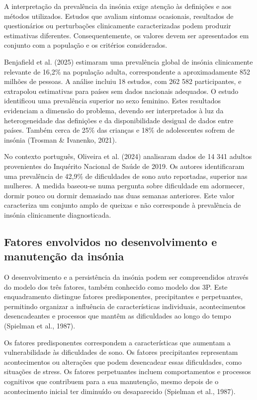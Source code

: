 A interpretação da prevalência da insónia exige atenção às definições e aos métodos utilizados. Estudos que avaliam sintomas ocasionais, resultados de questionários ou perturbações clinicamente caracterizadas podem produzir estimativas diferentes. Consequentemente, os valores devem ser apresentados em conjunto com a população e os critérios considerados.

Benjafield et al. (2025) estimaram uma prevalência global de insónia clinicamente relevante de 16,2\% na população adulta, correspondente a aproximadamente 852 milhões de pessoas. A análise incluiu 18 estudos, com 262 582 participantes, e extrapolou estimativas para países sem dados nacionais adequados. O estudo identificou uma prevalência superior no sexo feminino. Estes resultados evidenciam a dimensão do problema, devendo ser interpretados à luz da heterogeneidade das definições e da disponibilidade desigual de dados entre países. Também cerca de 25\% das crianças e 18\% de adolescentes sofrem de insónia (Trosman \& Ivanenko, 2021).

No contexto português, Oliveira et al. (2024) analisaram dados de 14 341 adultos provenientes do Inquérito Nacional de Saúde de 2019. Os autores identificaram uma prevalência de 42,9\% de dificuldades de sono auto reportadas, superior nas mulheres. A medida baseou-se numa pergunta sobre dificuldade em adormecer, dormir pouco ou dormir demasiado nas duas semanas anteriores. Este valor caracteriza um conjunto amplo de queixas e não corresponde à prevalência de insónia clinicamente diagnosticada.

\subsection{Fatores envolvidos no desenvolvimento e manutenção da insónia}
\label{sec:chap2_fatoresInsonia}

O desenvolvimento e a persistência da insónia podem ser compreendidos através do modelo dos três fatores, também conhecido como modelo dos 3P. Este enquadramento distingue fatores predisponentes, precipitantes e perpetuantes, permitindo organizar a influência de características individuais, acontecimentos desencadeantes e processos que mantêm as dificuldades ao longo do tempo (Spielman et al., 1987).

Os fatores predisponentes correspondem a características que aumentam a vulnerabilidade às dificuldades de sono. Os fatores precipitantes representam acontecimentos ou alterações que podem desencadear essas dificuldades, como situações de stress. Os fatores perpetuantes incluem comportamentos e processos cognitivos que contribuem para a sua manutenção, mesmo depois de o acontecimento inicial ter diminuído ou desaparecido (Spielman et al., 1987).

